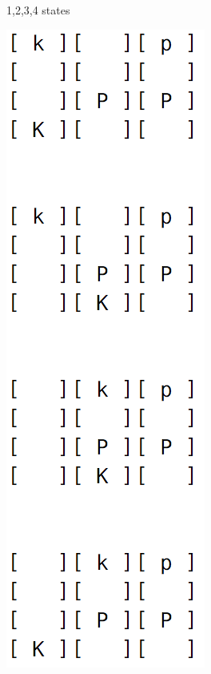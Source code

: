 \documentclass{article}
\begin{document}
\begin{figure}[h!]
\begin{subfigure}{0.23\textwidth}
                \caption{1,2,3,4 states}
        \end{subfigure}\qquad
        \begin{subfigure}{0.23\textwidth}
                \includegraphics[width=\linewidth]{visual_game_2}

\end{subfigure}
\end{figure}
\end{document}
